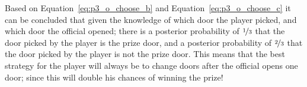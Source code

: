 Based on Equation~\ref{eq:p3_o_choose_b} and Equation~\ref{eq:p3_o_choose_c} it can be concluded that given the knowledge of which door the player picked, and which door the official opened; there is a posterior probability of $\nicefrac{1}{3}$ that the door picked by the player is the prize door, and a posterior probability of $\nicefrac{2}{3}$ that the door picked by the player is not the prize door. This means that the best strategy for the player will always be to change doors after the official opens one door; since this will double his chances of winning the prize!



